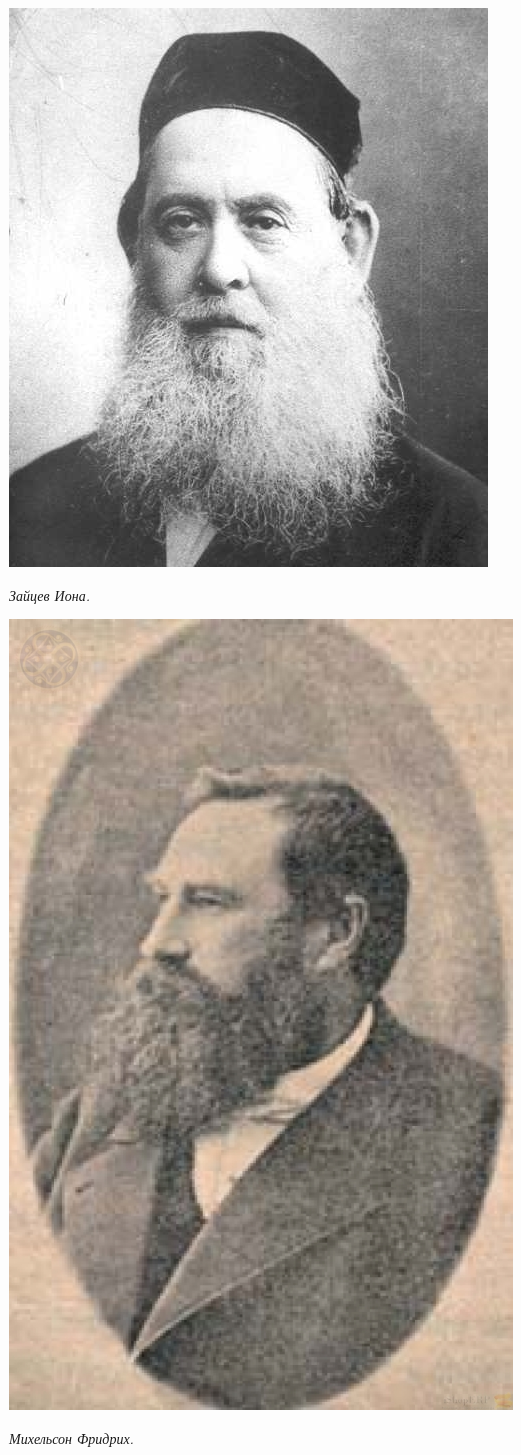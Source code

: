 \begin{center}
\includegraphics[width=0.60\linewidth]{faces/zajcev.jpg}

\textit{Зайцев Иона.}
\end{center} 

\vspace*{\fill}
\newpage

\begin{center}
\includegraphics[width=0.50\linewidth]{faces/mihelson.jpg}

\textit{Михельсон Фридрих.}
\end{center} 

